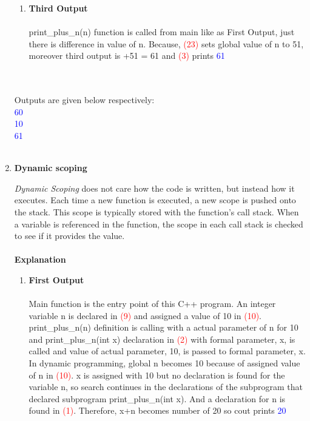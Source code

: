\documentclass{article}
\begin{document}
\begin{enumerate}[label=\textbf{\alph*)}]
\begin{enumerate}[label=\textbf{\alph*)}]
    \item \textbf{Third Output} \\~\\
    print\_plus\_n(n) function is called from main like as First Output, just there is difference in value of n. Because, \textcolor{red}{(23)} sets global value of n to 51, moreover third output is +51 = 61 and \textcolor{red}{(3)} prints \textcolor{blue}{61}
    \end{enumerate}
    \\~\\ Outputs are given below respectively: \\ \textcolor{blue}{60} \\ \textcolor{blue}{10} \\ \textcolor{blue}{61} \\~\\
    
\item \textbf{Dynamic scoping} 

\textit{Dynamic Scoping} does not care how the code is written, but instead how it executes. Each time a new function is executed, a new scope is pushed onto the stack. This scope is typically stored with the function’s call stack. When a variable is referenced in the function, the scope in each call stack is checked to see if it provides the value. \\~\\
\textbf{Explanation}  
\begin{enumerate}[label=\textbf{\alph*)}]
    \item \textbf{First Output} \\~\\
Main function is the entry point of this C++ program. An integer variable n is declared in \textcolor{red}{(9)} and assigned a value of 10 in \textcolor{red}{(10)}. print\_plus\_n(n) definition is calling with a actual parameter of n for 10 and print\_plus\_n(int x) declaration in \textcolor{red}{(2)} with formal parameter, x, is called and value of actual parameter, 10, is passed to formal parameter, x. In dynamic programming, global n becomes 10 because of assigned value of n in \textcolor{red}{(10)}.
    x is assigned with 10 but no declaration is found for the variable n, so search continues in the declarations of the subprogram that declared subprogram print\_plus\_n(int x). And a declaration for  n is found in \textcolor{red}{(1)}. Therefore, x+n becomes number of 20 so cout prints \textcolor{blue}{20}\\
   

\end{enumerate}
\end{enumerate}
\end{document}
